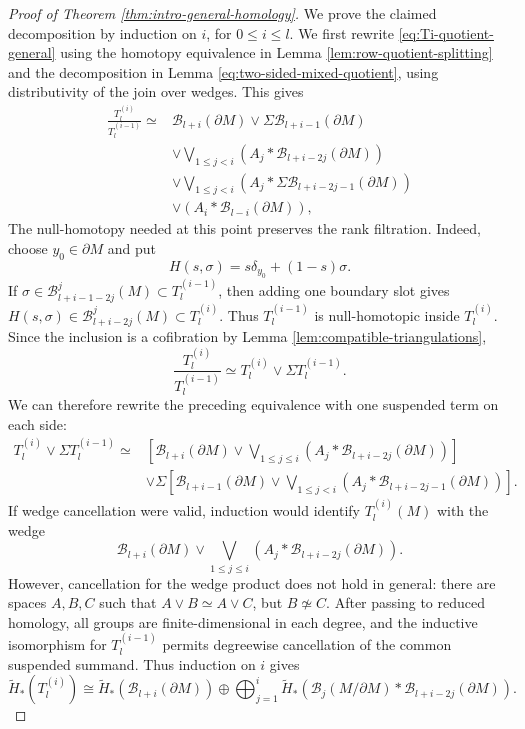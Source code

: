 \documentclass[11pt,a4paper]{article}
\numberwithin{equation}{section}
\theoremstyle{definition}
\theoremstyle{remark}
\newcommand{\pa}{\partial}
\newcommand{\wt}{\widetilde}
\newcommand{\BB}{\mathcal B}
\begin{document}
\begin{proof}[Proof of Theorem \ref{thm:intro-general-homology}]
We prove the claimed decomposition by induction on \(i\), for
\(0\le i\le l\).
We first rewrite \eqref{eq:Ti-quotient-general} using the homotopy equivalence in Lemma \ref{lem:row-quotient-splitting} and the decomposition in Lemma \ref{eq:two-sided-mixed-quotient}, using distributivity of the join over wedges. This gives
\begin{equation}\label{eq:Ti-quotient-expanded}
\begin{aligned}
\frac{T_l^{(i)}}
     {T_l^{(i-1)}}
\simeq {}&
\BB_{l+i}(\pa M)
\vee
\Sigma\BB_{l+i-1}(\pa M)
\\
&\vee
\bigvee_{1\leq j<i}
\left(
A_j*\BB_{l+i-2j}(\pa M)
\right)
\\
&\vee
\bigvee_{1\leq j<i}
\left(
A_j*\Sigma\BB_{l+i-2j-1}(\pa M)
\right)
\\
&\vee
\left(
A_i*\BB_{l-i}(\pa M)
\right),
\end{aligned}
\end{equation}
The null-homotopy needed at this point preserves the rank filtration.
Indeed, choose \(y_0\in\pa M\) and put
\[
H(s,\sigma)=s\delta_{y_0}+(1-s)\sigma .
\]
If \(\sigma\in\BB_{l+i-1-2j}^{j}(M)\subset T_l^{(i-1)}\), then adding
one boundary slot gives
\(H(s,\sigma)\in\BB_{l+i-2j}^{j}(M)\subset T_l^{(i)}\).
Thus \(T_l^{(i-1)}\) is null-homotopic inside \(T_l^{(i)}\). Since the
inclusion is a cofibration by Lemma \ref{lem:compatible-triangulations},
\[
\frac{T_l^{(i)}}{T_l^{(i-1)}}\simeq
T_l^{(i)}\vee\Sigma T_l^{(i-1)}.
\]
We can therefore rewrite the preceding equivalence with one suspended term
on each side:
\begin{equation}\label{eq:Ti-quotient-regrouped}
\begin{aligned}
 T_l^{(i)}\vee\Sigma T_l^{(i-1)}\simeq {}&
\left[
\BB_{l+i}(\pa M)
\vee
\bigvee_{1\leq j\leq i}
\left(
A_j*\BB_{l+i-2j}(\pa M)
\right)
\right]
\\
&\vee
\Sigma
\left[
\BB_{l+i-1}(\pa M)
\vee
\bigvee_{1\leq j<i}
\left(
A_j*\BB_{l+i-2j-1}(\pa M)
\right)
\right].
\end{aligned}
\end{equation}
If wedge cancellation were valid, induction would identify $T_l^{(i)}(M)$ with the wedge
\begin{equation}\label{splitformula}\BB_{l+i}(\pa M)
\vee
\bigvee_{1\leq j\leq i}
\left(
A_j*\BB_{l+i-2j}(\pa M)
\right)
.\end{equation}
However, cancellation for the wedge product does not hold in general: there are spaces $A,B,C$ such that $A\vee B\simeq A\vee C$, but $B\not\simeq C$. After passing to reduced homology, all groups are finite-dimensional in each degree, and the inductive isomorphism for $T_l^{(i-1)}$ permits degreewise cancellation of the common suspended summand. Thus induction on $i$ gives
\begin{equation}\label{eq:Ti-homology-final}
\wt H_*(T_l^{(i)})
\cong
\wt H_*(\BB_{l+i}(\pa M))
\oplus
\bigoplus_{j=1}^{i}
\wt H_*(\BB_j(M/\pa M)*\BB_{l+i-2j}(\pa M)).
\end{equation}


\end{proof}
\end{document}
